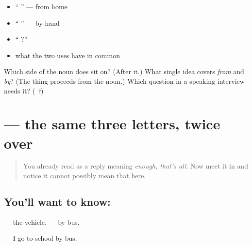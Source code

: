 \begin{itemize}
\raggedright
  \item \textquotedblleft{} \textquotedblright{} — from home
  \item \textquotedblleft{} \textquotedblright{} — by hand
  \item \textquotedblleft{}   ?\textquotedblright{}
  \item what the two uses have in common
\end{itemize}

\begin{tcolorbox}[breakable,colback=teal!4,colframe=teal!35!black,title={Before you move on}]
Which side of the noun does \textbf{} sit on? (After it.) What single idea covers \emph{from} and \emph{by}? (The thing proceeds from the noun.) Which question in a speaking interview needs it? (\emph{   ?})
\end{tcolorbox}
\section[\texorpdfstring{\hi{बस} \hi{से} (bas se)}{बस से (bas se)}]{  — the same three letters, twice over}

\label{lesson:HI-C90-bas}



\begin{quote}
You already read \textbf{} as a reply meaning \emph{enough, that's all}. Now meet it in \textbf{ } and notice it cannot possibly mean that here.
\end{quote}

\subsection*{You'll want to know:  }
\textbf{} — the vehicle. \textbf{ } — by bus.

\textbf{     } — I go to school by bus.

